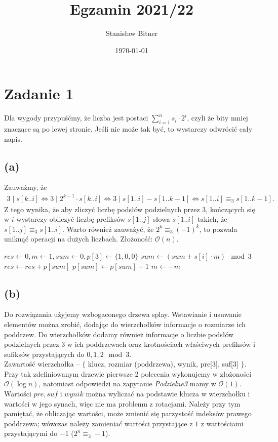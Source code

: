 \documentclass[12pt, a4paper]{article}
\title{Egzamin 2021/22}
\author{Stanisław Bitner}
\date{\today}
\newcommand{\MCALO}{\mathcal{O}}
\begin{document}
\maketitle

\section*{Zadanie 1}
Dla wygody przypuśćmy, że liczba jest postaci $\sum_{i=1}^n s_i \cdot 2^i$, czyli że
bity mniej znaczące są po lewej stronie. Jeśli nie może tak być, to wystarczy odwrócić cały napis.
\subsection*{(a)}
Zauważmy, że
\begin{align*}
  3 \mid s[k..i] \iff 3 \mid 2^{k-1} \cdot s[k..i] \iff 3 \mid s[1..i] - s[1..k-1]
  \iff s[1..i] \equiv_3 s[1..k-1].
\end{align*}
Z tego wynika, że aby zliczyć liczbę podsłów podzielnych przez 3, kończących się w $i$ wystarczy
obliczyć liczbę prefiksów $s[1..j]$ słowa $s[1..i]$ takich, że $s[1..j] \equiv_3 s[1..i]$.
Warto również zauważyć, że $2^k\equiv_3 (-1)^k$, to pozwala uniknąć operacji na dużych liczbach.
Złożoność: $\MCALO(n)$.

\begin{algorithmic}
\State $res \gets 0, m \gets 1, sum \gets 0, p[3] \gets \{1,0,0\}$
  \State $sum \gets (sum + s[i] \cdot m) \mod 3$
  \State $res \gets res + p[sum]$
  \State $p[sum] \gets p[sum] + 1$
  \State $m \gets -m$
\EndFor
\end{algorithmic}

\subsection*{(b)}
Do rozwiązania użyjemy wzbogaconego drzewa splay.
Wstawianie i usuwanie elementów można zrobić, dodając do wierzchołków informacje
o rozmiarze ich poddrzew. Do wierzchołków dodamy również informacje o liczbie podsłów
podzielnych przez 3 w ich poddrzewach oraz krotnościach właściwych prefiksów i sufiksów przystających
do $0,1,2 \mod 3$.\\
Zawartość wierzchołka --
$\{$ klucz, rozmiar (poddrzewa), wynik, pre[3], suf[3] $\}$.
Przy tak zdefiniowanym drzewie pierwsze 2 polecenia wykonujemy w złożoności
$\MCALO(\log{n})$, natomiast odpowiedzi na zapytanie \textit{Podzielne3} mamy
w $\MCALO(1)$.\\ Wartości $pre, suf$ i $wynik$ można wyliczać na podstawie
klucza w wierzchołku i wartości w jego synach, więc nie ma problemu
z rotacjami. Należy przy tym pamiętać, że obliczając wartości, może zmienić się
parzystość indeksów prawego poddrzewa; wówczas należy zamieniać wartości
przystające z $1$ z wartościami przystającymi do $-1$ ($2^n\equiv_3 -1$).
\end{document}
